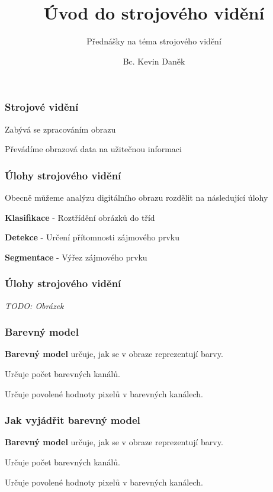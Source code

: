 \documentclass[FM]{tulpresentation}
\title{Úvod do strojového vidění}
\subtitle{Přednášky na téma strojového vidění}
\author{Bc. Kevin Daněk}
\begin{document}
\TULtitleframe

\begin{frame}
	\frametitle{Strojové vidění}
	\begin{items}
		\item Zabývá se zpracováním obrazu
		\item Převádíme obrazová data na užitečnou informaci
		\item 
	\end{items}
\end{frame}

\begin{frame}
	\frametitle{Úlohy strojového vidění}
	\begin{items}
		\item Obecně můžeme analýzu digitálního obrazu rozdělit na následující úlohy
		\begin{subitems}
			\item \textbf{Klasifikace} - Roztřídění obrázků do tříd
			\item \textbf{Detekce} - Určení přítomnosti zájmového prvku
			\item \textbf{Segmentace} - Výřez zájmového prvku
		\end{subitems}
	\end{items}
\end{frame}

\begin{frame}
	\frametitle{Úlohy strojového vidění}
	\textit{TODO: Obrázek}
\end{frame}

\begin{frame}
	\frametitle{Barevný model}
	\begin{items}
		\item \textbf{Barevný model} určuje, jak se v obraze reprezentují barvy.
		\item Určuje počet barevných kanálů.
		\item Určuje povolené hodnoty pixelů v barevných kanálech.
	\end{items}
\end{frame}

\begin{frame}
	\frametitle{Jak vyjádřit barevný model}
	\begin{items}
		\item \textbf{Barevný model} určuje, jak se v obraze reprezentují barvy.
		\item Určuje počet barevných kanálů.
		\item Určuje povolené hodnoty pixelů v barevných kanálech.
	\end{items}
\end{frame}
\TULendframe
\end{document}
